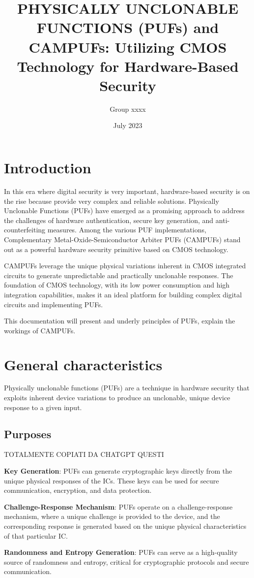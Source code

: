 \documentclass{article}
\title{\textbf{PHYSICALLY UNCLONABLE FUNCTIONS (PUFs) and CAMPUFs: Utilizing CMOS Technology for Hardware-Based Security}}
\author{ Group xxxx }
\date{July 2023}
\begin{document}
\maketitle 
\section{Introduction}
In this era where digital security is very important, hardware-based security  is on the rise because provide very complex and reliable solutions. Physically Unclonable Functions (PUFs) have emerged as a promising approach to address the challenges of hardware authentication, secure key generation, and anti-counterfeiting measures. Among the various PUF implementations, Complementary Metal-Oxide-Semiconductor Arbiter PUFs (CAMPUFs) stand out as a powerful hardware security primitive based on CMOS technology.

CAMPUFs leverage the unique physical variations inherent in CMOS integrated circuits to generate unpredictable and practically unclonable responses. The foundation of CMOS technology, with its low power consumption and high integration capabilities, makes it an ideal platform for building complex digital circuits and implementing PUFs.

This documentation will present and underly principles of PUFs, explain the workings of CAMPUFs.
\section{General characteristics}
Physically unclonable functions (PUFs) are a technique in hardware security that exploits inherent device variations to produce an unclonable, unique device response to a given input.
\subsection{Purposes} TOTALMENTE COPIATI DA CHATGPT QUESTI

\textbf{Key Generation}: PUFs can generate cryptographic keys directly from the unique physical responses of the ICs. These keys can be used for secure communication, encryption, and data protection.

\textbf{Challenge-Response Mechanism}: PUFs operate on a challenge-response mechanism, where a unique challenge is provided to the device, and the corresponding response is generated based on the unique physical characteristics of that particular IC.

\textbf{Randomness and Entropy Generation}: PUFs can serve as a high-quality source of randomness and entropy, critical for cryptographic protocols and secure communication.
\end{document}
